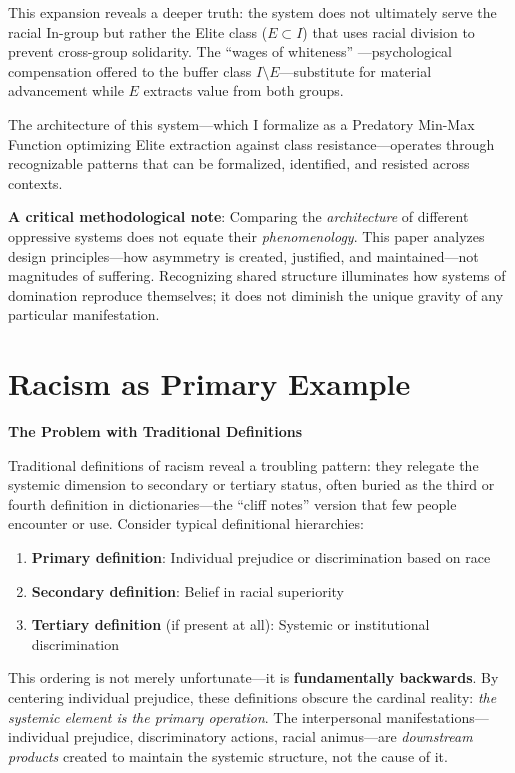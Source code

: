 \documentclass[12pt,openany]{book}
\begin{document}
This expansion reveals a deeper truth: the system does not ultimately serve the racial In-group but rather the Elite class ($E \subset I$) that uses racial division to prevent cross-group solidarity. The ``wages of whiteness'' \cite{roediger, dubois}---psychological compensation offered to the buffer class $I \setminus E$---substitute for material advancement while $E$ extracts value from both groups.

The architecture of this system---which I formalize as a Predatory Min-Max Function optimizing Elite extraction against class resistance---operates through recognizable patterns that can be formalized, identified, and resisted across contexts.

\textbf{A critical methodological note}: Comparing the \textit{architecture} of different oppressive systems does not equate their \textit{phenomenology}. This paper analyzes design principles---how asymmetry is created, justified, and maintained---not magnitudes of suffering. Recognizing shared structure illuminates how systems of domination reproduce themselves; it does not diminish the unique gravity of any particular manifestation.

\section{Racism as Primary Example}

\textbf{The Problem with Traditional Definitions}

Traditional definitions of racism reveal a troubling pattern: they relegate the systemic dimension to secondary or tertiary status, often buried as the third or fourth definition in dictionaries---the ``cliff notes'' version that few people encounter or use. Consider typical definitional hierarchies:

\begin{enumerate}
    \item \textbf{Primary definition}: Individual prejudice or discrimination based on race
    \item \textbf{Secondary definition}: Belief in racial superiority
    \item \textbf{Tertiary definition} (if present at all): Systemic or institutional discrimination
\end{enumerate}

This ordering is not merely unfortunate---it is \textbf{fundamentally backwards}. By centering individual prejudice, these definitions obscure the cardinal reality: \textit{the systemic element is the primary operation}. The interpersonal manifestations---individual prejudice, discriminatory actions, racial animus---are \textit{downstream products} created to maintain the systemic structure, not the cause of it.
\end{document}
